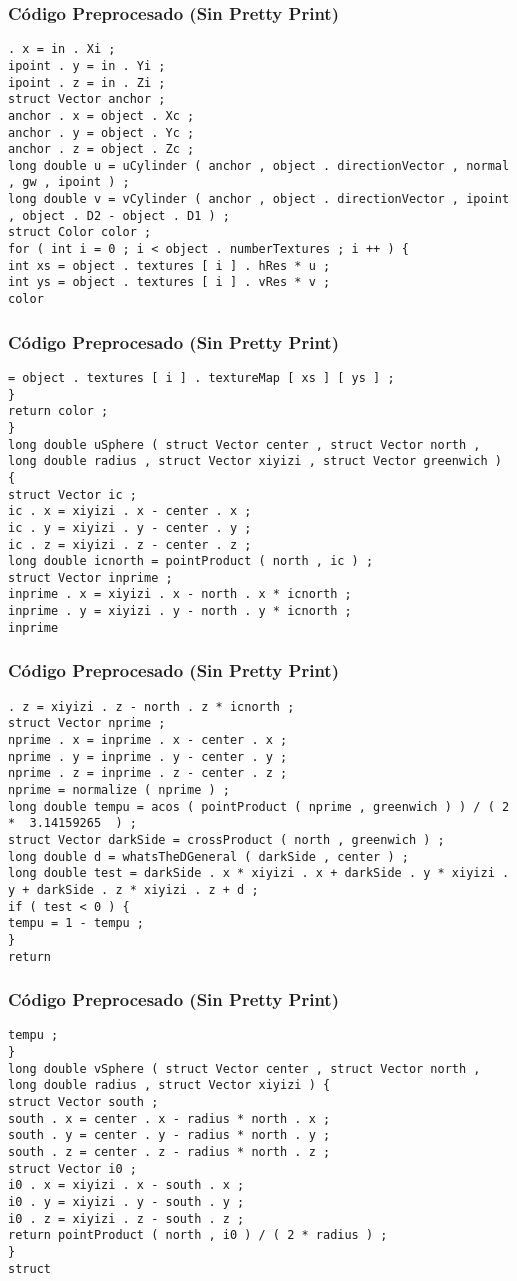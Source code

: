 \documentclass{beamer}
\begin{document}
\begin{frame}[fragile]
\frametitle{C\'odigo Preprocesado (Sin Pretty Print)}
\begin{lstlisting}[style=CStyle]
. x = in . Xi ; 
ipoint . y = in . Yi ; 
ipoint . z = in . Zi ; 
struct Vector anchor ; 
anchor . x = object . Xc ; 
anchor . y = object . Yc ; 
anchor . z = object . Zc ; 
long double u = uCylinder ( anchor , object . directionVector , normal , gw , ipoint ) ; 
long double v = vCylinder ( anchor , object . directionVector , ipoint , object . D2 - object . D1 ) ; 
struct Color color ; 
for ( int i = 0 ; i < object . numberTextures ; i ++ ) { 
int xs = object . textures [ i ] . hRes * u ; 
int ys = object . textures [ i ] . vRes * v ; 
color \end{lstlisting}
\end{frame}
\begin{frame}[fragile]
\frametitle{C\'odigo Preprocesado (Sin Pretty Print)}
\begin{lstlisting}[style=CStyle]
= object . textures [ i ] . textureMap [ xs ] [ ys ] ; 
} 
return color ; 
} 
long double uSphere ( struct Vector center , struct Vector north , long double radius , struct Vector xiyizi , struct Vector greenwich ) { 
struct Vector ic ; 
ic . x = xiyizi . x - center . x ; 
ic . y = xiyizi . y - center . y ; 
ic . z = xiyizi . z - center . z ; 
long double icnorth = pointProduct ( north , ic ) ; 
struct Vector inprime ; 
inprime . x = xiyizi . x - north . x * icnorth ; 
inprime . y = xiyizi . y - north . y * icnorth ; 
inprime \end{lstlisting}
\end{frame}
\begin{frame}[fragile]
\frametitle{C\'odigo Preprocesado (Sin Pretty Print)}
\begin{lstlisting}[style=CStyle]
. z = xiyizi . z - north . z * icnorth ; 
struct Vector nprime ; 
nprime . x = inprime . x - center . x ; 
nprime . y = inprime . y - center . y ; 
nprime . z = inprime . z - center . z ; 
nprime = normalize ( nprime ) ; 
long double tempu = acos ( pointProduct ( nprime , greenwich ) ) / ( 2 *  3.14159265  ) ; 
struct Vector darkSide = crossProduct ( north , greenwich ) ; 
long double d = whatsTheDGeneral ( darkSide , center ) ; 
long double test = darkSide . x * xiyizi . x + darkSide . y * xiyizi . y + darkSide . z * xiyizi . z + d ; 
if ( test < 0 ) { 
tempu = 1 - tempu ; 
} 
return \end{lstlisting}
\end{frame}
\begin{frame}[fragile]
\frametitle{C\'odigo Preprocesado (Sin Pretty Print)}
\begin{lstlisting}[style=CStyle]
tempu ; 
} 
long double vSphere ( struct Vector center , struct Vector north , long double radius , struct Vector xiyizi ) { 
struct Vector south ; 
south . x = center . x - radius * north . x ; 
south . y = center . y - radius * north . y ; 
south . z = center . z - radius * north . z ; 
struct Vector i0 ; 
i0 . x = xiyizi . x - south . x ; 
i0 . y = xiyizi . y - south . y ; 
i0 . z = xiyizi . z - south . z ; 
return pointProduct ( north , i0 ) / ( 2 * radius ) ; 
} 
struct \end{lstlisting}
\end{frame}
\end{document}
